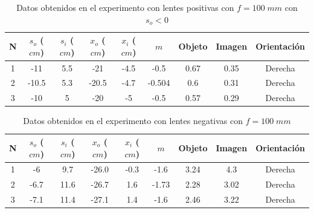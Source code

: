 \documentclass[13,twocolumn,letterpaper]{article}
\begin{document}
\begin{table}[h]
\centering
\begin{tabular}{|| c | c | c | c | c | c | c | c | c ||}
\hline \hline
	N & $s_{o}$ ($cm$) & $s_{i}$ ($cm$) & $x_{o}$  ($cm$) & $x_{i}$ ($cm$) & $m$ & Objeto & Imagen & Orientación  \\
\hline \hline
1 & -11 & 5.5	 & -21 	& -4.5 	& -0.5 & 0.67  	& 0.35 & Derecha \\
2 &  -10.5	 & 5.3 	 & -20.5 	& -4.7 	& -0.504 &  0.6	& 0.31 & Derecha \\
3 &   -10 & 5  & -20 	& -5 	& -0.5 & 0.57 	& 0.29 & Derecha \\ \hline
\end{tabular}
	\caption{Datos obtenidos en el experimento con lentes positivas con $f=100\;mm$ con  $s_{o}<0$} \label{tabla4}
\end{table}

\begin{table}[h]
\centering
\begin{tabular}{|| c | c | c | c | c | c | c | c | c ||}
\hline \hline
	N & $s_{o}$ ($cm$) & $s_{i}$ ($cm$) & $x_{o}$  ($cm$) & $x_{i}$ ($cm$) & $m$ & Objeto & Imagen & Orientación  \\
	\hline \hline
	1	& -6	&	  9.7	& -26.0 	& -0.3	& -1.6	&	3.24	&	4.3		&	Derecha	\\
	2	& -6.7	&	 11.6	& -26.7		& 1.6	& -1.73	&	2.28	&	3.02	&   Derecha	\\
	3	& -7.1	&	 11.4	& -27.1		& 1.4	& -1.6	&	2.46	&	3.22	&   Derecha	\\\hline \hline
\end{tabular} 
	\caption{Datos obtenidos en el experimento con lentes  negativas con $f=100\;mm$} 
\end{table}
\end{document}
